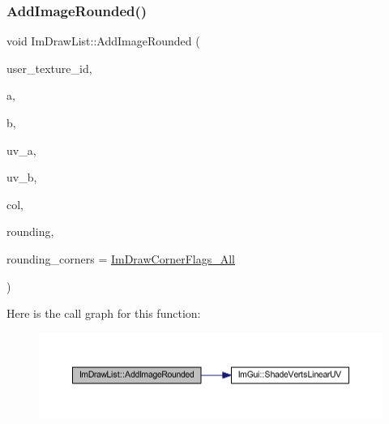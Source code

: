 \mbox{\label{struct_im_draw_list_a1418616a4350bad80b4c751cd8efac30}} 
\subsubsection{\texorpdfstring{Add\+Image\+Rounded()}{AddImageRounded()}}
{\footnotesize\ttfamily void Im\+Draw\+List\+::\+Add\+Image\+Rounded (\begin{DoxyParamCaption}\item[{\mbox{\hyperlink{imgui_8h_a364f4447ecbc4ca176145ccff9db6286}{Im\+Texture\+ID}}}]{user\+\_\+texture\+\_\+id,  }\item[{const \mbox{\hyperlink{struct_im_vec2}{Im\+Vec2}} \&}]{a,  }\item[{const \mbox{\hyperlink{struct_im_vec2}{Im\+Vec2}} \&}]{b,  }\item[{const \mbox{\hyperlink{struct_im_vec2}{Im\+Vec2}} \&}]{uv\+\_\+a,  }\item[{const \mbox{\hyperlink{struct_im_vec2}{Im\+Vec2}} \&}]{uv\+\_\+b,  }\item[{\mbox{\hyperlink{imgui_8h_a118cff4eeb8d00e7d07ce3d6460eed36}{Im\+U32}}}]{col,  }\item[{float}]{rounding,  }\item[{int}]{rounding\+\_\+corners = {\ttfamily \mbox{\hyperlink{imgui_8h_ad3b7317312a7b22064ff6b6d00a54258a4e075323857172f48c44c3953f5b03df}{Im\+Draw\+Corner\+Flags\+\_\+\+All}}} }\end{DoxyParamCaption})}

Here is the call graph for this function\+:
\nopagebreak
\begin{figure}[H]
\begin{center}
\leavevmode
\includegraphics[width=350pt]{struct_im_draw_list_a1418616a4350bad80b4c751cd8efac30_cgraph}
\end{center}
\end{figure}
\mbox{\label{struct_im_draw_list_a6db76ca2506dc86ad4d602fdcd2e2ea8}} 
